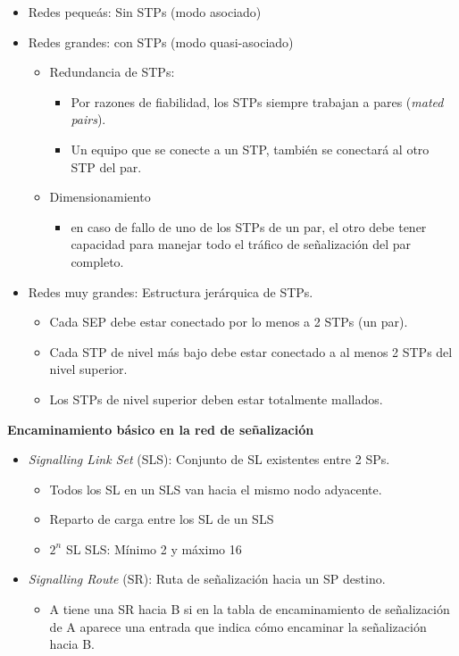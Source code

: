 \documentclass[10pt,portrait, twocolumn]{article}
\begin{document}
	\begin{itemize}
	\item Redes pequeás: Sin STPs (modo asociado)
	\item Redes grandes: con STPs (modo quasi-asociado)
		\begin{itemize}
		\item Redundancia de STPs:
			\begin{itemize}
			\item Por razones de fiabilidad, los STPs siempre trabajan a pares (\textit{mated pairs}).
			\item Un equipo que se conecte a un STP, también se conectará al otro STP del par.
			\end{itemize}
		\item Dimensionamiento
			\begin{itemize}
			\item en caso de fallo de uno de los STPs de un par, el otro debe tener capacidad para manejar todo el tráfico de señalización del par completo.
			\end{itemize}
		\end{itemize}
	\item Redes muy grandes: Estructura jerárquica de STPs.
		\begin{itemize}
		\item Cada SEP debe estar conectado por lo menos a 2 STPs (un par).
		\item Cada STP de nivel más bajo debe estar conectado a al menos 2 STPs del nivel superior.
		\item Los STPs de nivel superior deben estar totalmente mallados.
		\end{itemize}
	\end{itemize}
	
\textbf{Encaminamiento básico en la red de señalización}

	\begin{itemize}
	\item \textit{Signalling Link Set} (SLS): Conjunto de SL existentes entre 2 SPs.
		\begin{itemize}
		\item Todos los SL en un SLS van hacia el mismo nodo adyacente.
		\item Reparto de carga entre los SL de un SLS
		\item $2^{n}$ SL SLS: Mínimo 2 y máximo 16
		\end{itemize}
	\item \textit{Signalling Route} (SR): Ruta de señalización hacia un SP destino.
		\begin{itemize}
		\item A tiene una SR hacia B si en la tabla de encaminamiento de señalización de A aparece una entrada que indica cómo encaminar la señalización hacia B.
		\end{itemize}
	\end{itemize}
\end{document}
